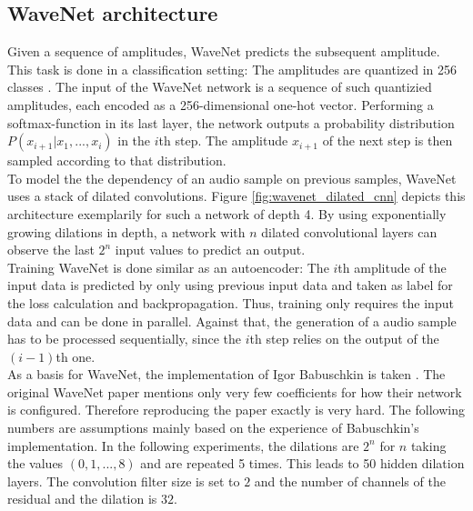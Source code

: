 \documentclass[10pt,conference,compsocconf]{IEEEtran}
\begin{document}
\subsection{WaveNet architecture}
Given a sequence of amplitudes, WaveNet predicts the subsequent amplitude. This task is done in a classification setting: The amplitudes are quantized in 256 classes \cite{itu1988711}. The input of the WaveNet network is a sequence of such quantizied amplitudes, each encoded as a 256-dimensional one-hot vector. Performing a softmax-function in its last layer, the network outputs a probability distribution $P(x_{i+1} | x_1, ..., x_i)$ in the $i$th step. The amplitude $x_{i+1}$ of the next step is then sampled according to that distribution.\\
To model the the dependency of an audio sample on previous samples, WaveNet uses a stack of dilated convolutions. Figure \ref{fig:wavenet_dilated_cnn} depicts this architecture exemplarily for such a network of depth 4. By using exponentially growing dilations in depth, a network with $n$ dilated convolutional layers can observe the last $2^n$ input values to predict an output.\\
Training WaveNet is done similar as an autoencoder: The $i$th amplitude of the input data is predicted by only using previous input data and taken as label for the loss calculation and backpropagation. Thus, training only requires the input data and can be done in parallel. Against that, the generation of a audio sample has to be processed sequentially, since the $i$th step relies on the output of the $(i-1)$th one.\\
As a basis for WaveNet, the implementation of Igor Babuschkin is taken \cite{Babuschkin2016}. The original WaveNet paper mentions only very few coefficients for how their network is configured. Therefore reproducing the paper exactly is very hard. The following numbers are assumptions mainly based on the experience of Babuschkin's implementation. In the following experiments, the dilations are $2^n$ for $n$ taking the values $(0,1,...,8)$ and are repeated 5 times. This leads to 50 hidden dilation layers. The convolution filter size is set to $2$ and the number of channels of the residual and the dilation is $32$.\\
\end{document}
